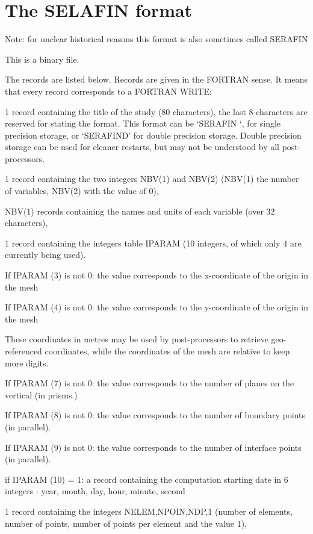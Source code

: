 \chapter{The SELAFIN format}

Note: for unclear historical reasons this format is also sometimes called SERAFIN

This is a binary file.

The records are listed below. Records are given in the FORTRAN sense. It means
that every record corresponds to a FORTRAN WRITE:

1 record containing the title of the study (80 characters), the last 8
characters are reserved for stating the format. This format can be `SERAFIN `,
for single precision storage, or `SERAFIND' for double precision storage.
Double precision storage can be used for cleaner restarts, but may not be
understood by all post-processors.

1 record containing the two integers NBV(1) and
NBV(2) (NBV(1) the number of variables, NBV(2)
with the value of 0),

NBV(1) records containing the names and units of each variable (over 32
characters),

1 record containing the integers table IPARAM (10 integers, of which only 4 are
currently being used).

If IPARAM (3) is not 0: the value corresponds to the x-coordinate of the origin
in the mesh

If IPARAM (4) is not 0: the value corresponds to the y-coordinate of the origin
in the mesh

These coordinates in metres may be used by post-processors to retrieve
geo-referenced coordinates, while the coordinates of the mesh are relative to
keep more digits.

If IPARAM (7) is not 0: the value corresponds to the number of planes on the
vertical (in prisms.)

If IPARAM (8) is not 0: the value corresponds to the number of boundary points
(in parallel).

If IPARAM (9) is not 0: the value corresponds to the number of interface points
(in parallel).

if IPARAM (10) = 1: a record containing the computation starting date in 6
integers : year, month, day, hour, minute, second

1 record containing the integers NELEM,NPOIN,NDP,1 (number of elements, number
of points, number of points per element and the value 1),

